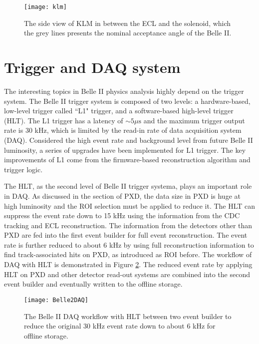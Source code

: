 \begin{figure}[htbp]
	\centering
\texttt{[image: klm]}
\caption{The side view of KLM in between the ECL and the solenoid, which the grey lines presents the nominal acceptance angle of the Belle II\cite{Abe:2010gxa}. }
\label{fig:klm}
\end{figure}




\section{Trigger and DAQ system}
The interesting topics in Belle II physics analysis highly depend on the trigger system. The Belle II trigger system is composed of two levels: a hardware-based, low-level trigger called ``L1" trigger, and a software-based high-level trigger (HLT). The L1 trigger has a latency of $\sim 5 \mu\text{s}$ and the maximum trigger output rate is 30 kHz, which is limited by the read-in rate of data acquisition system (DAQ). Considered the high event rate and background level from future Belle II luminosity, a series of upgrades have been implemented for L1 trigger. The key improvements of L1 come from the firmware-based reconstruction algorithm and trigger logic.

The HLT, as the second level of Belle II trigger systema, plays an important role in DAQ. As discussed in the section of PXD, the data size in PXD is huge at high luminosity and the ROI selection must be applied to reduce it. The HLT can suppress the event rate down to 15 kHz using the information from the CDC tracking and ECL reconstruction. The information from the detectors other than PXD are fed into the first event builder for full event reconstruction. The event rate is further reduced to  about $6$ kHz by using full reconstruction information to find track-associated hits on PXD, as introduced as ROI before. The workflow of DAQ with HLT is demonstrated in Figure \ref{fig:daq}. The reduced event rate by applying HLT on PXD and other detector read-out systems are combined into the second event builder and eventually written to the offline storage. 

\begin{figure}[htbp]
	\centering
	\texttt{[image: Belle2DAQ]}
	\caption{The Belle II DAQ workflow with HLT between two event builder to reduce the original 30 kHz event rate down to about 6 kHz for offline storage.}
	\label{fig:daq}
\end{figure}


